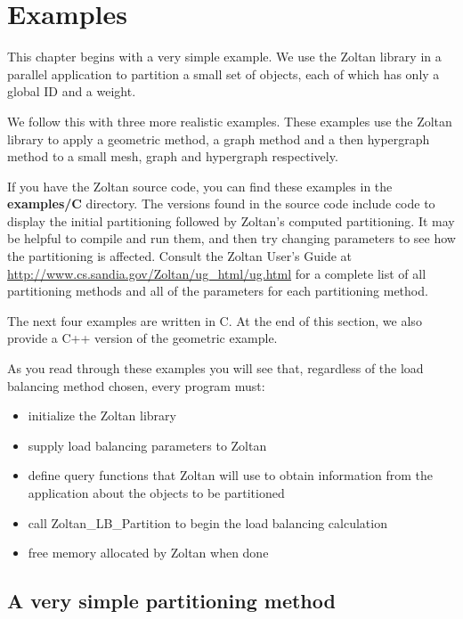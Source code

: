 %
%
\chapter{Examples}
\label{cha:ex}

This chapter begins with a very simple example.  We use the Zoltan
library in a parallel application to partition a small set of 
objects, each of which has only a global ID and a weight.

We follow this with three more realistic examples.
These examples use the Zoltan library to apply a geometric method,
a graph method and a then hypergraph method to a small mesh, graph
and hypergraph respectively.

If you have the Zoltan source code, you can find these
examples in the \textbf{examples/C} directory.  The versions
found in the source code include code to
display the initial partitioning followed by Zoltan's computed
partitioning.  It may be helpful to compile and run them, and
then try changing parameters 
to see how the partitioning is affected.  Consult the Zoltan
User's Guide at
\url{http://www.cs.sandia.gov/Zoltan/ug_html/ug.html}
for a complete list of all partitioning methods and all of the
parameters for each partitioning method.

The next four examples are written in C.  At the end of this section,
we also provide a C++ version of the geometric example.

As you read through these examples you will see that, regardless 
of the load balancing method chosen, every program must:

\begin{itemize}
\item initialize the Zoltan library
\item supply load balancing parameters to Zoltan
\item define query functions that Zoltan will use to obtain information from the application about the objects to be partitioned
\item call Zoltan\_LB\_Partition to begin the load balancing calculation
\item free memory allocated by Zoltan when done
\end{itemize}

\clearpage
\section{A very simple partitioning method}

